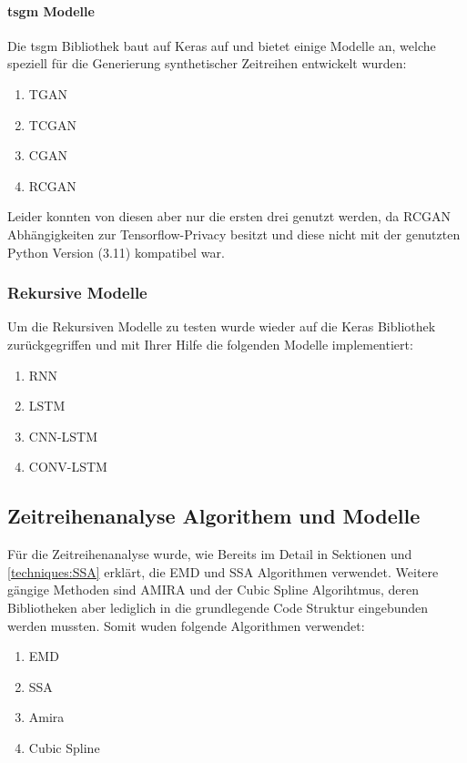 \paragraph{tsgm Modelle}
Die tsgm Bibliothek \cite{nikitin2023tsgm} baut auf Keras auf und bietet einige Modelle an, welche speziell für die Generierung synthetischer Zeitreihen entwickelt wurden:
\begin{enumerate}
    \item TGAN
    \item TCGAN
    \item CGAN
    \item RCGAN
\end{enumerate}
Leider konnten von diesen aber nur die ersten drei genutzt werden, da RCGAN Abhängigkeiten zur Tensorflow-Privacy besitzt und diese nicht mit der genutzten Python Version (3.11) kompatibel war.

\subsubsection{Rekursive Modelle}
Um die Rekursiven Modelle zu testen wurde wieder auf die Keras Bibliothek zurückgegriffen und mit Ihrer Hilfe die folgenden Modelle implementiert:
\begin{enumerate}
    \item RNN
    \item LSTM
    \item CNN-LSTM
    \item CONV-LSTM
\end{enumerate}

\subsection{Zeitreihenanalyse Algorithem und Modelle}
\label{sec:tsa_models}
Für die Zeitreihenanalyse wurde, wie Bereits im Detail in Sektionen \label{techniques:EMD} und \ref{techniques:SSA} erklärt, die \ac{EMD} und \ac{SSA} Algorithmen verwendet.
Weitere gängige Methoden sind \ac{AMIRA} und der Cubic Spline Algorihtmus, deren Bibliotheken aber lediglich in die grundlegende Code Struktur eingebunden werden mussten. Somit wuden folgende Algorithmen verwendet:

\begin{enumerate}
    \item EMD
    \item SSA
    \item Amira
    \item Cubic Spline
\end{enumerate}
